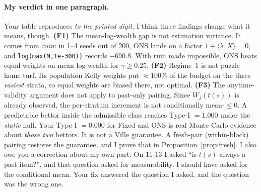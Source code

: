 \documentclass[11pt]{article}
\begin{document}
\paragraph{My verdict in one paragraph.} Your table reproduces \emph{to the printed digit}. I think three findings change what it means, though.
\textbf{(F1)} The mean-log-wealth gap is not estimation variance. It comes from \emph{ruin}: in 1--4 seeds out of 200, ONS lands on a factor $1+\langle\lambda,X\rangle=0$, and \texttt{log(max(M,1e-300))} records $-690.8$. With ruin made impossible, ONS beats equal weights on mean log-wealth for $\gamma\ge0.25$.
\textbf{(F2)} Regime~1 is not puzzle home turf. Its population Kelly weights put $\approx\!100\%$ of the budget on the three \emph{easiest} strata, so equal weights are biased there, not optimal.
\textbf{(F3)} The anytime-validity argument does not apply to past-only pairing. Since $W_j(t(s))$ is already observed, the per-stratum increment is not conditionally mean-$\le0$. A predictable bettor inside the admissible class reaches Type-I $=1.000$ under the \emph{static} null. Your Type-I $=0.000$ for Fixed and ONS is real Monte Carlo evidence about \emph{those two} bettors. It is not a Ville guarantee. A fresh-pair (within-block) pairing restores the guarantee, and I prove that in Proposition~\ref{prop:fresh}.
I also owe you a correction about my own part. On 11-13 I asked ``is $t(s)$ always a past item?'', and that question asked for measurability. I should have asked for the conditional mean. Your fix answered the question I asked, and the question was the wrong one.
\end{document}
